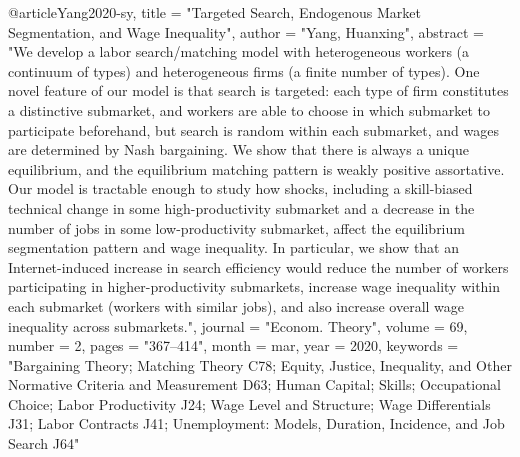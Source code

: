{@article{Yang2020-sy,
	title    = "Targeted Search, Endogenous Market Segmentation, and Wage
	Inequality",
	author   = "Yang, Huanxing",
	abstract = "We develop a labor search/matching model with heterogeneous
	workers (a continuum of types) and heterogeneous firms (a finite
	number of types). One novel feature of our model is that search
	is targeted: each type of firm constitutes a distinctive
	submarket, and workers are able to choose in which submarket to
	participate beforehand, but search is random within each
	submarket, and wages are determined by Nash bargaining. We show
	that there is always a unique equilibrium, and the equilibrium
	matching pattern is weakly positive assortative. Our model is
	tractable enough to study how shocks, including a skill-biased
	technical change in some high-productivity submarket and a
	decrease in the number of jobs in some low-productivity
	submarket, affect the equilibrium segmentation pattern and wage
	inequality. In particular, we show that an Internet-induced
	increase in search efficiency would reduce the number of workers
	participating in higher-productivity submarkets, increase wage
	inequality within each submarket (workers with similar jobs), and
	also increase overall wage inequality across submarkets.",
	journal  = "Econom. Theory",
	volume   =  69,
	number   =  2,
	pages    = "367--414",
	month    =  mar,
	year     =  2020,
	keywords = "Bargaining Theory; Matching Theory C78; Equity, Justice,
	Inequality, and Other Normative Criteria and Measurement D63;
	Human Capital; Skills; Occupational Choice; Labor Productivity
	J24; Wage Level and Structure; Wage Differentials J31; Labor
	Contracts J41; Unemployment: Models, Duration, Incidence, and Job
	Search J64"
}

}
